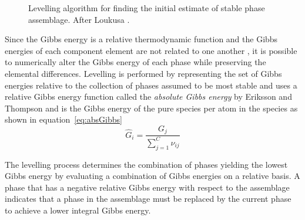 \begin{figure}[ht]
  		\caption[Levelling algorithm for finding the initial estimate of stable phase assemblage.]{Levelling algorithm for finding the initial estimate of stable phase assemblage. After Loukusa \cite{Loukusa:2014aa}.}
  		\label{fig:levelling}
 	\end{figure}

	Since the Gibbs energy is a relative thermodynamic function and the Gibbs energies of each component element are not related to one another \cite{Eriksson89}, it is possible to numerically alter the Gibbs energy of each phase while preserving the elemental differences. Levelling is performed by representing the set of Gibbs energies relative to the collection of phases assumed to be most stable and uses a relative Gibbs energy function called the \textit{absolute Gibbs energy} by Eriksson and Thompson and is the Gibbs energy of the pure species per atom in the species as shown in equation~\eqref{eq:absGibbs}
	\begin{equation}\label{eq:absGibbs}
		\hat{G}_i = \frac{G_j}{\sum_{j=1}^C \nu_{ij}}
	\end{equation}

	The levelling process determines the combination of phases yielding the lowest Gibbs energy by evaluating a combination of Gibbs energies on a relative basis. A phase that has a negative relative Gibbs energy with respect to the assemblage indicates that a phase in the assemblage must be replaced by the current phase to achieve a lower integral Gibbs energy.

